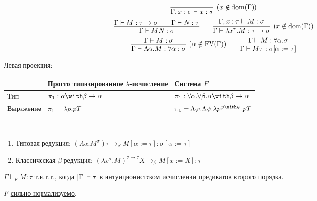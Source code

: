 \begin{definition}
    \begin{gather*}
        \infer[(x \notin \mathrm{dom}(\Gamma))]{\Gamma, x : \sigma \vdash x : \sigma}{} \\
        \infer{\Gamma \vdash MN : \sigma}{\Gamma \vdash M : \tau \rightarrow \sigma && \Gamma \vdash N : \tau} \qquad
        \infer[(x \notin \mathrm{dom}(\Gamma))]
                {\Gamma \vdash \lambda x^\tau . M : \tau \rightarrow \sigma}{\Gamma, x : \tau \vdash M : \sigma} \\
        \infer[(\alpha \notin \FV(\Gamma))]{\Gamma \vdash \Lambda \alpha . M : \forall \alpha : \sigma}{\Gamma \vdash M : \sigma} \qquad
        \infer{\Gamma \vdash M \tau : \sigma [\alpha := \tau]}{\Gamma \vdash M : \forall \alpha . \sigma}
    \end{gather*}
\end{definition}

\begin{example} Левая проекция:
    \begin{center}
    \begin{tabular}{l l l} \toprule
        & Просто типизированное $\lambda$-исчисление & Система $F$ \\ \midrule
        Тип & $\pi_1:\alpha\with\beta\rightarrow\alpha$ & $\pi_1:\forall \alpha . \forall \beta . \alpha \with \beta \rightarrow \alpha$ \\
        Выражение & $\pi_1 = \lambda p . p T$ & $\pi_1 = \Lambda \varphi . \Lambda \psi . \lambda p^{\varphi\with\psi} . p T$
        \\ \bottomrule
    \end{tabular}
    \end{center}
\end{example}

\begin{definition} \ 
    \begin{enumerate}
        \item Типовая редукция: $\left(\Lambda \alpha . M^\sigma\right) \tau \rightarrow_\beta M[\alpha:=\tau] : \sigma[\alpha := \tau]$
        \item Классическая $\beta$-редукция: $\left(\lambda x^\sigma.M\right)^{\sigma\rightarrow\tau} X \rightarrow_\beta M [x:=X] : \tau$
    \end{enumerate}
\end{definition}

\begin{theorem}
    $\Gamma \vdash_F M :\tau$ т.и.т.т., когда $\left|\Gamma\right| \vdash \tau$ в интуиционистском исчислении предикатов второго порядка.
\end{theorem}

\begin{theorem}
    $F$ \hyperref[strong-normalization]{сильно нормализуемо}.
\end{theorem}

\todo 
